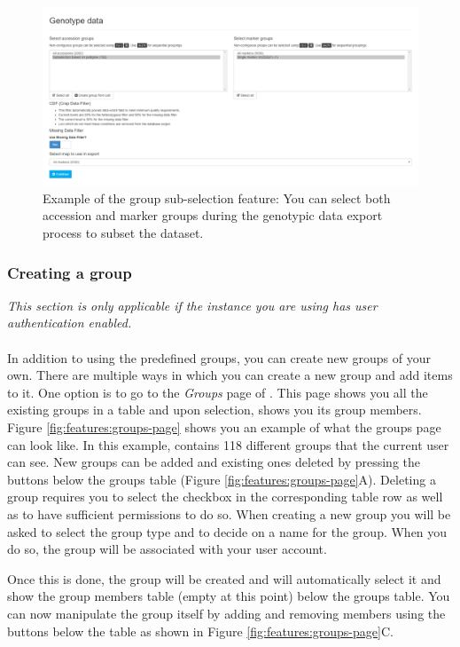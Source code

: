 \begin{figure}
	\centering
	\includegraphics[width=0.85\linewidth]{img/features/group-subselection.png}
	\caption{Example of the group sub-selection feature: You can select both accession and marker groups during the genotypic data export process to subset the dataset.}
	\label{fig:features:group-subselection}
\end{figure}

\subsubsection{Creating a group}
\textit{This section is only applicable if the {\germinate} instance you are using has user authentication enabled.}\\
\\
In addition to using the predefined groups, you can create new groups of your own. There are multiple ways in which you can create a new group and add items to it. One option is to go to the \textit{Groups} page of {\germinate}. This page shows you all the existing groups in a table and upon selection, shows you its group members. Figure \ref{fig:features:groups-page} shows you an example of what the groups page can look like. In this example, {\germinate} contains 118 different groups that the current user can see. New groups can be added and existing ones deleted by pressing the buttons below the groups table (Figure \ref{fig:features:groups-page}A). Deleting a group requires you to select the checkbox in the corresponding table row as well as to have sufficient permissions to do so. When creating a new group you will be asked to select the group type and to decide on a name for the group. When you do so, the group will be associated with your user account.

Once this is done, the group will be created and {\germinate} will automatically select it and show the group members table (empty at this point) below the groups table. You can now manipulate the group itself by adding and removing members using the buttons below the table as shown in Figure \ref{fig:features:groups-page}C.

